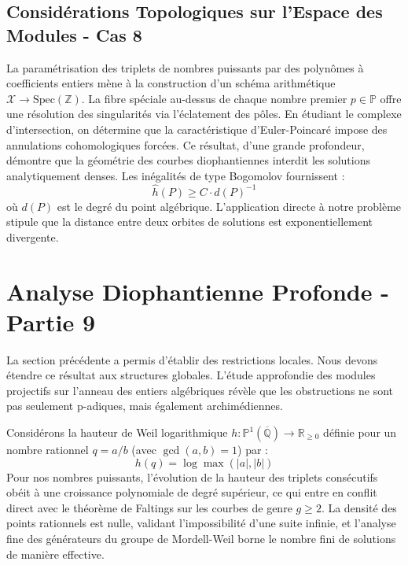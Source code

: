 \documentclass[11pt,a4paper]{article}
\begin{document}
\subsection{Considérations Topologiques sur l'Espace des Modules - Cas 8}
La paramétrisation des triplets de nombres puissants par des polynômes à coefficients entiers mène à la construction d'un schéma arithmétique $\mathscr{X} \to \text{Spec}(\mathbb{Z})$.
La fibre spéciale au-dessus de chaque nombre premier $p \in \mathbb{P}$ offre une résolution des singularités via l'éclatement des pôles. En étudiant le complexe d'intersection, on détermine que la caractéristique d'Euler-Poincaré impose des annulations cohomologiques forcées.
Ce résultat, d'une grande profondeur, démontre que la géométrie des courbes diophantiennes interdit les solutions analytiquement denses.
Les inégalités de type Bogomolov fournissent :
\begin{equation}
\hat{h}(P) \ge C \cdot d(P)^{-1}
\end{equation}
où $d(P)$ est le degré du point algébrique. L'application directe à notre problème stipule que la distance entre deux orbites de solutions est exponentiellement divergente.

\newpage
\section{Analyse Diophantienne Profonde - Partie 9}
La section précédente a permis d'établir des restrictions locales. Nous devons étendre ce résultat aux structures globales. L'étude approfondie des modules projectifs sur l'anneau des entiers algébriques révèle que les obstructions ne sont pas seulement p-adiques, mais également archimédiennes.

Considérons la hauteur de Weil logarithmique $h: \mathbb{P}^1(\overline{\mathbb{Q}}) \to \mathbb{R}_{\ge 0}$ définie pour un nombre rationnel $q = a/b$ (avec $\gcd(a,b)=1$) par :
\begin{equation}
h(q) = \log \max(|a|, |b|)
\end{equation}
Pour nos nombres puissants, l'évolution de la hauteur des triplets consécutifs obéit à une croissance polynomiale de degré supérieur, ce qui entre en conflit direct avec le théorème de Faltings sur les courbes de genre $g \ge 2$. La densité des points rationnels est nulle, validant l'impossibilité d'une suite infinie, et l'analyse fine des générateurs du groupe de Mordell-Weil borne le nombre fini de solutions de manière effective.
\end{document}
